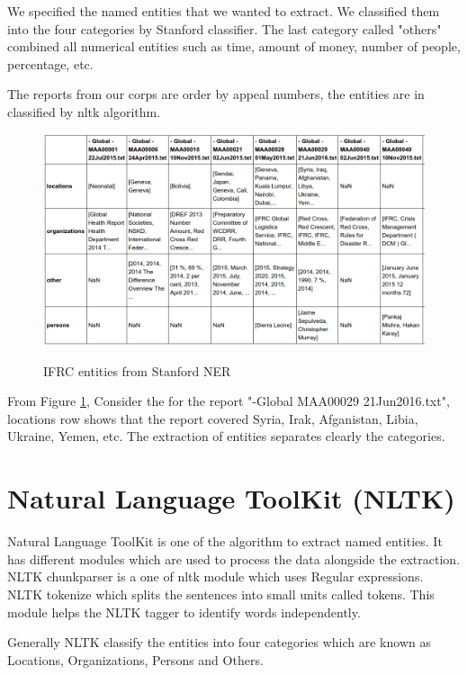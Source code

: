 We specified the named entities that we wanted to extract. We classified them into the four categories by Stanford classifier.  The last category called "others" combined all numerical entities such as time, amount of money, number of people, percentage, etc. 

The reports from our corps are order by appeal numbers, the entities are in classified by nltk algorithm. 

\newpage

\begin{figure}[hbtp]
\caption{IFRC entities from Stanford NER}
\centering\includegraphics[scale =.45]{images/stanford.png} \label{stanford}
\end{figure}
From Figure \ref{stanford},  Consider the for the report "-Global MAA00029 21Jun2016.txt", locations row  shows that the report covered Syria, Irak, Afganistan, Libia, Ukraine, Yemen, etc.
The extraction of entities separates clearly the categories.
\section{Natural Language ToolKit (NLTK)}
Natural Language ToolKit is one of the algorithm to extract named  entities. It has different modules which are used to process the data alongside the extraction.
NLTK chunkparser is a one of nltk module  which uses Regular expressions. NLTK tokenize which splits the sentences into small units called tokens. This module helps the NLTK tagger to identify words independently. 

Generally NLTK classify the entities into four categories which are known as Locations, Organizations, Persons and Others.

